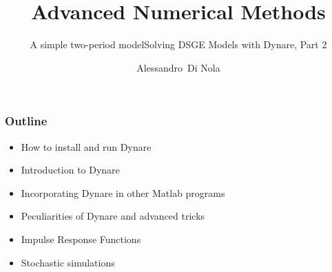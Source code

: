 \documentclass{beamer}
\subtitle{A simple two-period model}
\institute[Universities Here and There]{University of Birmingham}
\begin{document}
\title{Advanced Numerical Methods}
\subtitle{Solving DSGE Models with Dynare, Part 2}
\author{Alessandro~Di Nola}
\date{}

\begin{frame}
\titlepage
\end{frame}


\begin{frame}%
\frametitle{Outline}

\begin{itemize}
\item How to install and run Dynare

\item Introduction to Dynare

\item Incorporating Dynare in other Matlab programs

\item Peculiarities of Dynare and advanced tricks

\item Impulse Response Functions

\item Stochastic simulations



\end{itemize}

\end{frame}%
\end{document}
